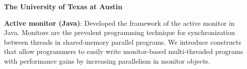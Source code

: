 

\begin{myexp}
\item \textbf{The University of Texas at Austin}   
    \begin{myexp}
    \item {\bf Active monitor (Java)}:
            Developed the framework of the active monitor in Java. Monitors are
            the prevalent programming technique for synchronization between
            threads in shared-memory parallel programs. We introduce constructs
            that allow programmers to easily write monitor-based multi-threaded
            programs with performance gains by increasing parallelism in
            monitor objects.


\end{myexp}
\end{myexp}
